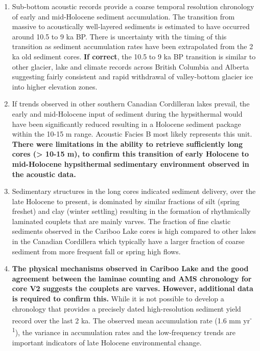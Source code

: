 \documentclass[Royal,times,doublespace,sageh]{sagej}
\providecommand{\tightlist}{%
  \setlength{\itemsep}{0pt}\setlength{\parskip}{0pt}}
\begin{document}
\begin{enumerate}
\def\labelenumi{\arabic{enumi}.}
\tightlist
\item
  Sub-bottom acoustic records provide a coarse temporal resolution
  chronology of early and mid-Holocene sediment accumulation. The
  transition from massive to acoustically well-layered sediments is
  estimated to have occurred around 10.5 to 9 ka BP. There is
  uncertainty with the timing of this transition as sediment
  accumulation rates have been extrapolated from the 2 ka old sediment
  cores. \textbf{If correct}, the 10.5 to 9 ka BP transition is similar
  to other glacier, lake and climate records across British Columbia and
  Alberta suggesting fairly consistent and rapid withdrawal of
  valley-bottom glacier ice into higher elevation zones.
\item
  If trends observed in other southern Canadian Cordilleran lakes
  prevail, the early and mid-Holocene input of sediment during the
  hypsithermal would have been significantly reduced resulting in a
  Holocene sediment package within the 10-15 m range. Acoustic Facies B
  most likely represents this unit. \textbf{There were limitations in
  the ability to retrieve sufficiently long cores (\textgreater{} 10-15
  m), to confirm this transition of early Holocene to mid-Holocene
  hypsithermal sedimentary environment observed in the acoustic data.}
\item
  Sedimentary structures in the long cores indicated sediment delivery,
  over the late Holocene to present, is dominated by similar fractions
  of silt (spring freshet) and clay (winter settling) resulting in the
  formation of rhythmically laminated couplets that are mainly varves.
  The fraction of fine clastic sediments observed in the Cariboo Lake
  cores is high compared to other lakes in the Canadian Cordillera which
  typically have a larger fraction of coarse sediment from more frequent
  fall or spring high flows.
\item
  \textbf{The physical mechanisms observed in Cariboo Lake and the good
  agreement between the laminae counting and AMS chronology for core V2
  suggests the couplets are varves. However, additional data is required
  to confirm this.} While it is not possible to develop a chronology
  that provides a precisely dated high-resolution sediment yield record
  over the last 2 ka. The observed mean accumulation rate (1.6 mm
  yr\textsuperscript{-1}), the variance in accumulation rates and the
  low-frequency trends are important indicators of late Holocene
  environmental change.

\end{enumerate}
\end{document}
